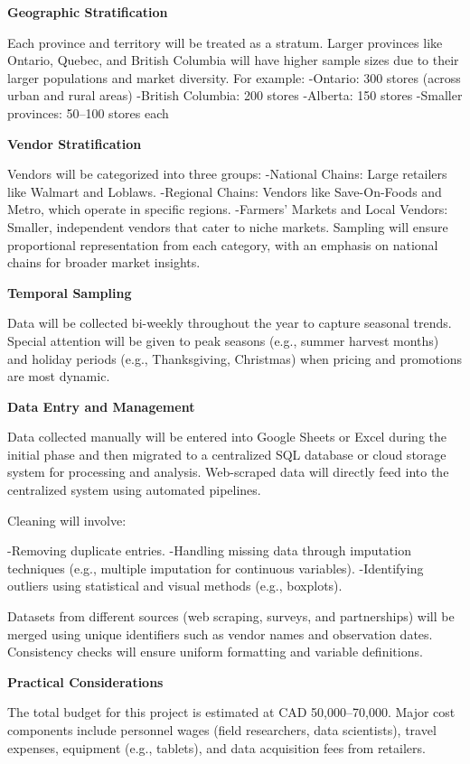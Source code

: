 \documentclass[
  letterpaper,
  DIV=11,
  numbers=noendperiod]{scrartcl}
\begin{document}
\textbf{Geographic Stratification}

Each province and territory will be treated as a stratum. Larger
provinces like Ontario, Quebec, and British Columbia will have higher
sample sizes due to their larger populations and market diversity. For
example: -Ontario: 300 stores (across urban and rural areas) -British
Columbia: 200 stores -Alberta: 150 stores -Smaller provinces: 50--100
stores each

\textbf{Vendor Stratification}

Vendors will be categorized into three groups: -National Chains: Large
retailers like Walmart and Loblaws. -Regional Chains: Vendors like
Save-On-Foods and Metro, which operate in specific regions. -Farmers'
Markets and Local Vendors: Smaller, independent vendors that cater to
niche markets. Sampling will ensure proportional representation from
each category, with an emphasis on national chains for broader market
insights.

\textbf{Temporal Sampling}

Data will be collected bi-weekly throughout the year to capture seasonal
trends. Special attention will be given to peak seasons (e.g., summer
harvest months) and holiday periods (e.g., Thanksgiving, Christmas) when
pricing and promotions are most dynamic.

\textbf{Data Entry and Management}

Data collected manually will be entered into Google Sheets or Excel
during the initial phase and then migrated to a centralized SQL database
or cloud storage system for processing and analysis. Web-scraped data
will directly feed into the centralized system using automated
pipelines.

Cleaning will involve:

-Removing duplicate entries. -Handling missing data through imputation
techniques (e.g., multiple imputation for continuous variables).
-Identifying outliers using statistical and visual methods (e.g.,
boxplots).

Datasets from different sources (web scraping, surveys, and
partnerships) will be merged using unique identifiers such as vendor
names and observation dates. Consistency checks will ensure uniform
formatting and variable definitions.

\textbf{Practical Considerations}

The total budget for this project is estimated at CAD 50,000--70,000.
Major cost components include personnel wages (field researchers, data
scientists), travel expenses, equipment (e.g., tablets), and data
acquisition fees from retailers.
\end{document}

